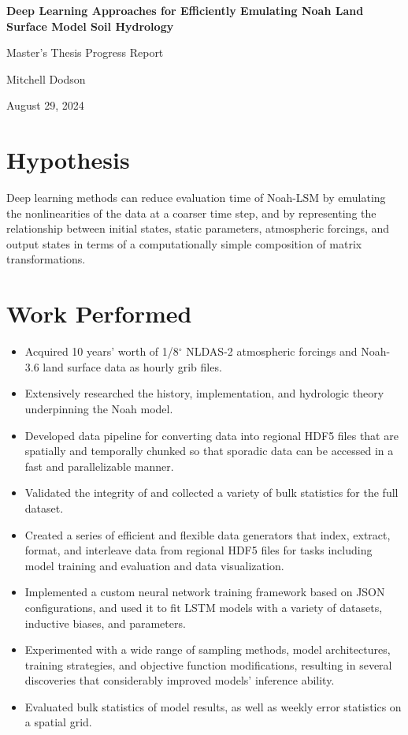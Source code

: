\documentclass[11pt]{article}
\begin{document}
\noindent
{\Large\textbf{Deep Learning Approaches for Efficiently Emulating Noah Land Surface Model Soil Hydrology}}

\vspace{.8em}

\noindent
\large{Master's Thesis Progress Report}

\noindent
\large{Mitchell Dodson}

\noindent
\large{August 29, 2024}

\vspace{-.8em}

\section{Hypothesis}

Deep learning methods can reduce evaluation time of Noah-LSM by emulating the nonlinearities of the data at a coarser time step, and by representing the relationship between initial states, static parameters, atmospheric forcings, and output states in terms of a computationally simple composition of matrix transformations.

\section{Work Performed}

\begin{itemize}\itemsep.5em
        \item Acquired 10 years' worth of 1/8$^\circ$ NLDAS-2 atmospheric forcings and Noah-3.6 land surface data as hourly grib files.
        \item Extensively researched the history, implementation, and hydrologic theory underpinning the Noah model.
        \item Developed data pipeline for converting data into regional HDF5 files that are spatially and temporally chunked so that sporadic data can be accessed in a fast and parallelizable manner.
        \item Validated the integrity of and collected a variety of bulk statistics for the full dataset.
        \item Created a series of efficient and flexible data generators that index, extract, format, and interleave data from regional HDF5 files for tasks including model training and evaluation and data visualization.
        \item Implemented a custom neural network training framework based on JSON configurations, and used it to fit LSTM models with a variety of datasets, inductive biases, and parameters.
        \item Experimented with a wide range of sampling methods, model architectures, training strategies, and objective function modifications, resulting in several discoveries that considerably improved models' inference ability.
        \item Evaluated bulk statistics of model results, as well as weekly error statistics on a spatial grid.
\end{itemize}
\end{document}
